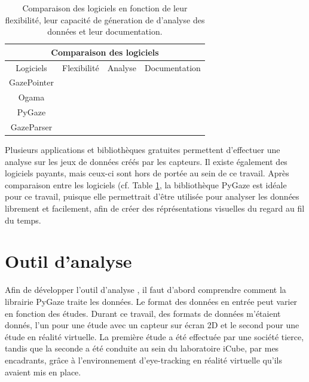 \documentclass[hidelinks,12pt]{article}
\newcommand{\cmark}{\ding{51}}
\newcommand{\xmark}{\ding{55}}
\begin{document}
\bigskip
\begin{table}[htpb]
  \begin{center}
    \begin{tabular}{|c||c|c|c|}
      \hline
      \multicolumn{4}{|c|}{Comparaison des logiciels}             \\
      \hline
      Logiciels   & Flexibilité   & Analyse       & Documentation \\
      \hline
      GazePointer & \xmark        & \cmark        & \cmark        \\
      Ogama       & \xmark        & \cmark \cmark & \cmark        \\
      PyGaze      & \cmark \cmark & \cmark \cmark & \cmark \cmark \\
      GazeParser  & \cmark        & \cmark \cmark & \cmark        \\
      \hline
    \end{tabular}
    \caption{Comparaison des logiciels en fonction de leur flexibilité, leur
      capacité de géneration de d'analyse des données et leur documentation.}
    \label{tab:comparaison}
  \end{center}
\end{table}

Plusieurs applications et bibliothèques gratuites permettent d'effectuer une
analyse sur les jeux de données créés par les capteurs. Il existe également des
logiciels payants, mais ceux-ci sont hors de portée au sein de ce
travail. Après comparaison entre les logiciels (cf. Table \ref{tab:comparaison},
la bibliothèque PyGaze est idéale pour ce travail, puisque elle permettrait
d'être utilisée pour analyser les données librement et facilement, afin de
créer des réprésentations visuelles du regard au fil du temps.


\section{Outil d'analyse}

Afin de développer l'outil d'analyse \cite{github_ter}, il faut d'abord
comprendre comment la librairie PyGaze traite les données. Le format des
données en entrée peut varier en fonction des études. Durant ce travail, des
formats de données m'étaient donnés, l'un pour une étude avec un capteur sur
écran 2D et le second pour une étude en réalité virtuelle. La première étude a
été effectuée par une société tierce, tandis que la seconde a été conduite au
sein du laboratoire iCube, par mes encadrants, grâce à l'environnement
d'eye-tracking en réalité virtuelle qu'ils avaient mis en place.
\end{document}
